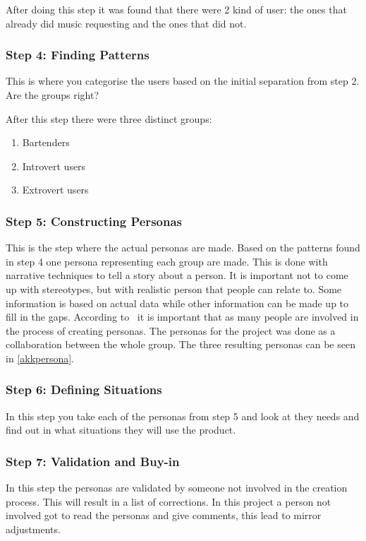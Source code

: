 After doing this step it was found that there were 2 kind of user: the ones that already did music requesting and the ones that did not.

\subsubsection{Step 4: Finding Patterns}
This is where you categorise the users based on the initial separation from step 2. Are the groups right?

After this step there were three distinct groups:
\begin{enumerate}
\item Bartenders
\item Introvert users 
\item Extrovert users
\end{enumerate}

\subsubsection{Step 5: Constructing Personas}
This is the step where the actual personas are made. Based on the patterns found in step 4 one persona representing each group are made. This is done with narrative techniques to tell a story about a person. It is important not to come up with stereotypes, but with realistic person that people can relate to. Some information is based on actual data while other information can be made up to fill in the gaps. According to~\cite{lene2007persona} it is important that as many people are involved in the process of creating personas. The personas for the project was done as a collaboration between the whole group. The three resulting personas can be seen in \cref{akkpersona}.

\subsubsection{Step 6: Defining Situations}
In this step you take each of the personas from step 5 and look at they needs and find out in what situations they will use the product.


\subsubsection{Step 7: Validation and Buy-in}
In this step the personas are validated by someone not involved in the creation process. This will result in a list of corrections. In this project a person not involved got to read the personas and give comments, this lead to mirror adjustments.

